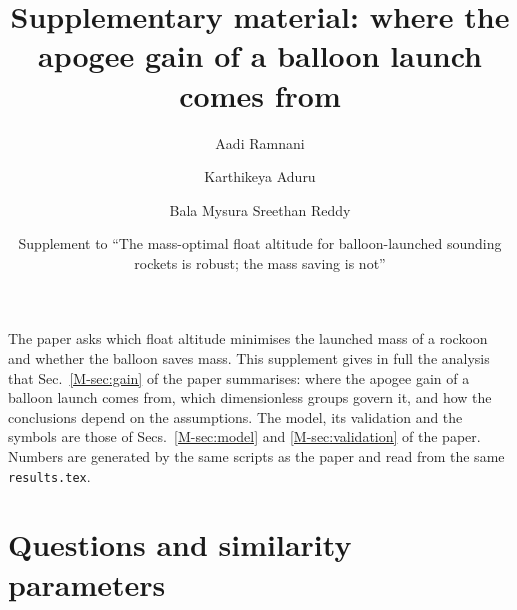 \documentclass[11pt,a4paper]{article}
\title{\textbf{Supplementary material: where the apogee gain of a balloon launch comes from}}
\author{Aadi Ramnani \and Karthikeya Aduru \and Bala Mysura Sreethan Reddy}
\date{Supplement to ``The mass-optimal float altitude for balloon-launched sounding rockets is robust; the mass saving is not''}
\begin{document}
\maketitle

\noindent The paper asks which float altitude minimises the launched mass of a rockoon and whether the balloon saves mass. This supplement gives in full the analysis that Sec.~\ref{M-sec:gain} of the paper summarises: where the apogee gain of a balloon launch comes from, which dimensionless groups govern it, and how the conclusions depend on the assumptions. The model, its validation and the symbols are those of Secs.~\ref{M-sec:model} and \ref{M-sec:validation} of the paper. Numbers are generated by the same scripts as the paper and read from the same \texttt{results.tex}.

\section{Questions and similarity parameters}
\label{sec:groups}
\end{document}
